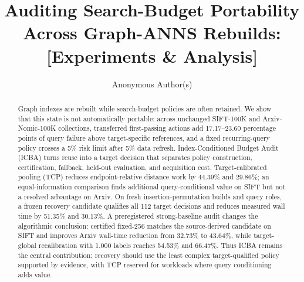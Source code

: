 \documentclass[sigconf,anonymous]{acmart}
\title[Auditing Search-Budget Portability]{Auditing Search-Budget Portability Across Graph-ANNS Rebuilds: [Experiments \& Analysis]}
\author{Anonymous Author(s)}
\begin{document}
\begin{abstract}
Graph indexes are rebuilt while search-budget policies are often retained. We show that this state is not automatically portable: across unchanged SIFT-100K and Arxiv-Nomic-100K collections, transferred first-passing actions add 17.17--23.60 percentage points of query failure above target-specific references, and a fixed recurring-query policy crosses a 5\% risk limit after 5\% data refresh. Index-Conditioned Budget Audit (ICBA) turns reuse into a target decision that separates policy construction, certification, fallback, held-out evaluation, and acquisition cost. Target-calibrated pooling (TCP) reduces endpoint-relative distance work by 44.39\% and 29.86\%; an equal-information comparison finds additional query-conditional value on SIFT but not a resolved advantage on Arxiv. On fresh insertion-permutation builds and query roles, a frozen recovery candidate qualifies all 112 target decisions and reduces measured wall time by 51.35\% and 30.13\%. A preregistered strong-baseline audit changes the algorithmic conclusion: certified fixed-256 matches the source-derived candidate on SIFT and improves Arxiv wall-time reduction from 32.73\% to 43.64\%, while target-global recalibration with 1,000 labels reaches 54.53\% and 66.47\%. Thus ICBA remains the central contribution; recovery should use the least complex target-qualified policy supported by evidence, with TCP reserved for workloads where query conditioning adds value.
\end{abstract}
\maketitle
\raggedbottom











\balance


\end{document}
